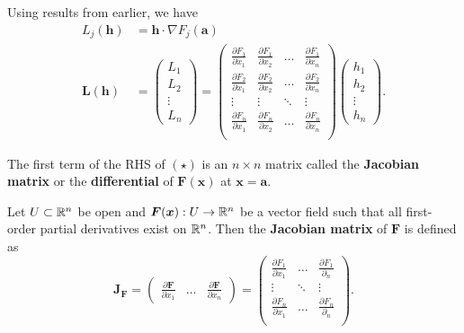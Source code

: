 Using results from earlier, we have
\begin{align*}
    L_j(\bm h) &= \bm h \cdot \nabla F_j(\bm a) \\
    \bm L(\bm h) &=
        \begin{pmatrix}
            L_1 \\ L_2 \\ \vdots \\ L_n
        \end{pmatrix} =
        \begin{pmatrix}
            \frac{\partial F_1}{\partial x_1} &
            \frac{\partial F_1}{\partial x_2} &
            \ldots &
            \frac{\partial F_1}{\partial x_n} \\
            \frac{\partial F_2}{\partial x_1} &
            \frac{\partial F_2}{\partial x_2} &
            \ldots &
            \frac{\partial F_2}{\partial x_n} \\
            \vdots & \vdots & \ddots & \vdots \\
            \frac{\partial F_n}{\partial x_1} &
            \frac{\partial F_n}{\partial x_2} &
            \ldots &
            \frac{\partial F_n}{\partial x_n} \\
        \end{pmatrix}
        \begin{pmatrix}
            h_1 \\ h_2 \\ \vdots \\ h_n
        \end{pmatrix}.
        \tag{$\star$}
\end{align*}

The first term of the RHS of $(\star)$ is an $n \times n$ matrix
called the \textbf{Jacobian matrix} or the \textbf{differential}
of $\bm F(\bm x)$ at $\bm x = \bm a$.

\begin{definition}
    Let $U \subset \mathbb{R}^n$ be open
    and $\bm F(\bm x): U \to \mathbb{R}^n$ be a vector field 
    such that all first-order partial derivatives exist on $\mathbb{R}^n$.
    Then the \textbf{Jacobian matrix} of $\bm F$ is defined as
    \[
        \bm J_{\bm F} =
        \begin{pmatrix}
            \frac{\partial \bm F}{\partial x_1} & \ldots & \frac{\partial \bm F}{\partial x_n} 
        \end{pmatrix}
        =
        \begin{pmatrix}
            \frac{\partial F_1}{\partial x_1} & \ldots & \frac{\partial F_1}{\partial_n} \\
            \vdots & \ddots & \vdots \\
            \frac{\partial F_n}{\partial x_1} & \ldots & \frac{\partial F_n}{\partial_n} \\
        \end{pmatrix}
        .
    \]
\end{definition}

